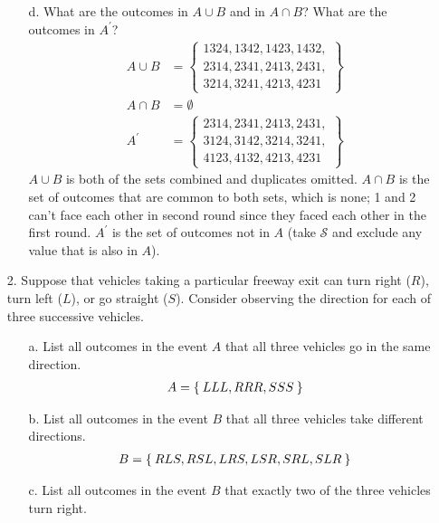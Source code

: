 \documentclass[letterpaper,12pt]{article}
\begin{document}
\begin{enumerate}
\begin{enumerate}
      \item[d.]
        What are the outcomes in $A \cup B$ and in $A \cap B$? What are the outcomes in $A^\prime$?
        \begin{align*}
          A \cup B &=
          \left\{\begin{array}{l}
            1324, 1342, 1423, 1432, \\
            2314, 2341, 2413, 2431, \\
            3214, 3241, 4213, 4231
          \end{array}\right\} \\
          A \cap B &= \emptyset \\
          A^\prime &=
          \left\{\begin{array}{l}
            2314, 2341, 2413, 2431, \\
            3124, 3142, 3214, 3241, \\
            4123, 4132, 4213, 4231
          \end{array}\right\}
        \end{align*}
        $A \cup B$ is both of the sets combined and duplicates omitted. $A \cap B$ is the set of outcomes that are common to both sets, which is none; 1 and 2 can't face each other in second round since they faced each other in the first round. $A^\prime$ is the set of outcomes not in $A$ (take $\mathcal{S}$ and exclude any value that is also in $A$).
    \end{enumerate}
  \item[2.]
    Suppose that vehicles taking a particular freeway exit can turn right ($R$), turn left ($L$), or go straight ($S$). Consider observing the direction for each of three successive vehicles.
    \begin{enumerate}
      \item[a.]
        List all outcomes in the event $A$ that all three vehicles go in the same direction.
        \begin{align*}
          A = \Set{LLL, RRR, SSS}
        \end{align*}
      \item[b.]
        List all outcomes in the event $B$ that all three vehicles take different directions.
        \begin{align*}
          B = \Set{RLS, RSL, LRS, LSR, SRL, SLR}
        \end{align*}
      \item[c.]
        List all outcomes in the event $B$ that exactly two of the three vehicles turn right.

\end{enumerate}
\end{enumerate}
\end{document}
